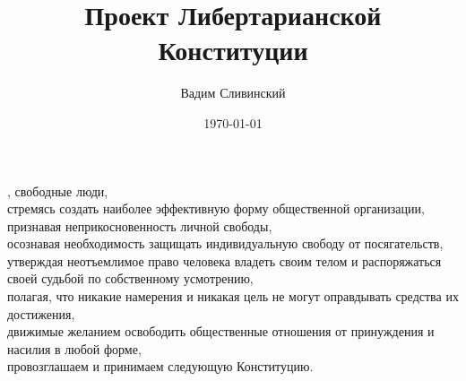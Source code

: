 \documentclass[12pt]{constitution}
\begin{document}
\title{Проект Либертарианской Конституции}
\author{Вадим Сливинский}
\date{\today}
\maketitle
\setcounter{tocdepth}{2}
\tableofcontents
\newpage

, свободные люди,\\
стремясь создать наиболее эффективную форму общественной организации,\\
признавая неприкосновенность личной свободы,\\
осознавая необходимость защищать индивидуальную свободу от посягательств,\\
утверждая неотъемлимое право человека владеть своим телом и распоряжаться своей судьбой по собственному усмотрению, \\
полагая, что никакие намерения и никакая цель не могут оправдывать средства их достижения,\\
движимые желанием освободить общественные отношения от принуждения и насилия в любой форме,\\
провозглашаем и принимаем следующую Конституцию.


\end{document}
